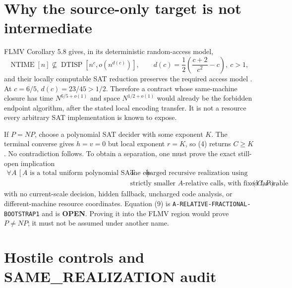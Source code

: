 \documentclass[11pt]{article}
\newcommand{\OPEN}{\textbf{OPEN}}
\begin{document}
\section{Why the source-only target is not intermediate}

FLMV Corollary 5.8 gives, in its deterministic random-access model,
\[
 \operatorname{NTIME}[n]\not\subseteq
 \operatorname{DTISP}\!\left[n^c,o\!\left(n^{d(c)}\right)\right],
 \qquad d(c)=\frac12\left(\frac{c+2}{c^2}-c\right),\ c>1, \tag{8}
\]
and their locally computable SAT reduction preserves the required access
model \cite{flmv}.  At $c=6/5$, $d(c)=23/45>1/2$.  Therefore a contract whose
same-machine closure has time $N^{6/5+o(1)}$ and space $N^{1/2+o(1)}$ would
already be the forbidden endpoint algorithm, after the stated local encoding
transfer.  It is not a resource every arbitrary SAT implementation is known
to expose.

If $P=NP$, choose a polynomial SAT decider with some exponent $K$.  The
terminal converse gives $h=v=0$ but local exponent $r=K$, so (4) returns
$C\ge K$.  No contradiction follows.  To obtain a separation, one must prove
the exact still-open implication
\[
 \begin{aligned}
 \forall A\,[A\text{ is a total uniform polynomial SAT decider}]\quad
 \Longrightarrow\quad &\text{one charged recursive realization using only}\\[-1mm]
 &\text{strictly smaller $A$-relative calls, with fixed favorable }(C,P),
 \end{aligned}                                             \tag{9}
\]
with no current-scale decision, hidden fallback, uncharged code analysis, or
different-machine resource coordinates.  Equation (9) is
\texttt{A-RELATIVE-FRACTIONAL-BOOTSTRAP1} and is \OPEN.  Proving it into the
FLMV region would prove $P\ne NP$; it must not be assumed under another name.

\section{Hostile controls and SAME\_REALIZATION audit}
\end{document}
